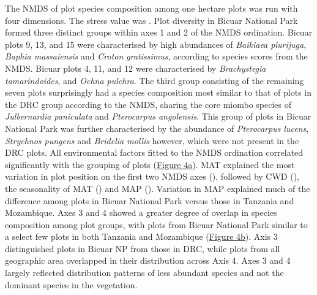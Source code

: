 \begin{refsection}
The NMDS of plot species composition among one hectare plots was run with four dimensions. The stress value was \nmdsstress{}. Plot diversity in Bicuar National Park formed three distinct groups within axes 1 and 2 of the NMDS ordination. Bicuar plots 9, 13, and 15 were characterised by high abundances of \textit{Baikiaea plurijuga}, \textit{Baphia massaiensis} and \textit{Croton gratissimus}, according to species scores from the NMDS. Bicuar plots 4, 11, and 12 were characterised  by \textit{Brachystegia tamarindoides}, and \textit{Ochna pulchra}. The third group consisting of the remaining seven plots surprisingly had a species composition most similar to that of plots in the DRC group according to the NMDS, sharing the core miombo species of \textit{Julbernardia paniculata} and \textit{Pterocarpus angolensis}. This group of plots in Bicuar National Park was further characterised by the abundance of \textit{Pterocarpus lucens}, \textit{Strychnos pungens} and \textit{Bridelia mollis} however, which were not present in the DRC plots. All environmental factors fitted to the NMDS ordination correlated significantly with the grouping of plots (\hyperref[all_nmds_envfit]{Figure 4a}). MAT explained the most variation in plot position on the first two NMDS axes (\nmdsmat{}), followed by CWD (\nmdsmapsd{}), the seasonality of MAT (\nmdsmatsd{}) and MAP (\nmdsmap{}). Variation in MAP explained much of the difference among plots in Bicuar National Park versus those in Tanzania and Mozambique. Axes 3 and 4 showed a greater degree of overlap in species composition among plot groups, with plots from Bicuar National Park similar to a select few plots in both Tanzania and Mozambique (\hyperref[all_nmds_envfit_low]{Figure 4b}). Axis 3 distinguished plots in Bicuar NP from those in DRC, while plots from all geographic area overlapped in their distribution across Axis 4. Axes 3 and 4 largely reflected distribution patterns of less abundant species and not the dominant species in the vegetation.



\end{refsection}
